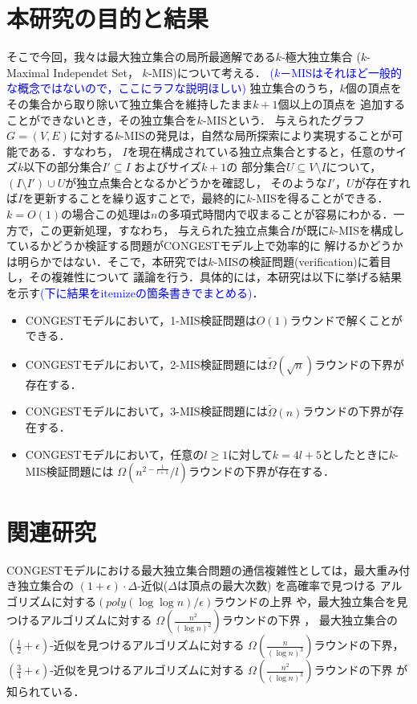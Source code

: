\documentclass[12pt]{thesis}
\newcommand{\Izumi}[1]{\textcolor{blue}{(#1)}}
\newcommand{\CONGEST}{\textsf{CONGEST}}
\theoremstyle{definition}
\begin{document}
\section{本研究の目的と結果}
そこで今回，我々は最大独立集合の局所最適解である$k$-極大独立集合
($k$-Maximal Independet Set， $k$-MIS)について考える．
\Izumi{$k$－MISはそれほど一般的な概念ではないので，ここにラフな説明ほしい}
独立集合のうち，$k$個の頂点をその集合から取り除いて独立集合を維持したまま$k + 1$個以上の頂点を
追加することができないとき，その独立集合を$k$-MISという．
与えられたグラフ$G=(V, E)$に対する$k$-MISの発見は，自然な局所探索により実現することが可能である．すなわち，
$I$を現在構成されている独立点集合とすると，任意のサイズ$k$以下の部分集合$I' \subseteq I$ およびサイズ$k + 1$の
部分集合$U \subseteq V\setminus I$について，$(I \setminus I') \cup U$が独立点集合となるかどうかを確認し，
そのような$I'$，$U$が存在すれば$I$を更新することを繰り返すことで，最終的に$k$-MISを得ることができる．
$k = O(1)$の場合この処理は$n$の多項式時間内で収まることが容易にわかる．一方で，この更新処理，すなわち，
与えられた独立点集合$I$が既に$k$-MISを構成しているかどうか検証する問題が{\CONGEST}モデル上で効率的に
解けるかどうかは明らかではない．そこで，本研究では$k$-MISの検証問題(verification)に着目し，その複雑性について
議論を行う．具体的には，本研究は以下に挙げる結果を示す\Izumi{下に結果をitemizeの箇条書きでまとめる}．
\begin{itemize}
\item {\CONGEST}モデルにおいて，1-MIS検証問題は$O(1)$ラウンドで解くことができる．
\item {\CONGEST}モデルにおいて，2-MIS検証問題には$\tilde{\Omega} (\sqrt{n})$ラウンドの下界が存在する．
\item {\CONGEST}モデルにおいて，3-MIS検証問題には$\tilde{\Omega} (n)$ラウンドの下界が存在する．
\item {\CONGEST}モデルにおいて，任意の$l \geq 1$に対して$k = 4l + 5$としたときに$k$-MIS検証問題には
$\Omega\left(n^{2 - \frac{1}{l+1}}/l\right)$ラウンドの下界が存在する．
\end{itemize}

\section{関連研究} 
{\CONGEST}モデルにおける最大独立集合問題の通信複雑性としては，最大重み付き独立集合の
$(1 + \epsilon) \cdot \Delta$-近似($\Delta$は頂点の最大次数) を高確率で見つける
アルゴリズムに対する$\left(poly(\log \log n)/\epsilon \right)$ラウンドの上界
\cite{kawarabayashi2019improved} や，最大独立集合を見つけるアルゴリズムに対する
$\Omega \left(\frac{n^{2}}{(\log n)^{2}}\right)$ラウンドの下界 \cite{censor2017quadratic}，
最大独立集合の$(\frac{1}{2} + \epsilon)$-近似を見つけるアルゴリズムに対する
$\Omega \left(\frac{n}{(\log n)^{3}}\right)$ラウンドの下界，
$(\frac{3}{4} + \epsilon)$-近似を見つけるアルゴリズムに対する
$\Omega \left(\frac{n^{2}}{(\log n)^{3}}\right)$ラウンドの下界 \cite{efron2020beyond} が知られている．
\end{document}
